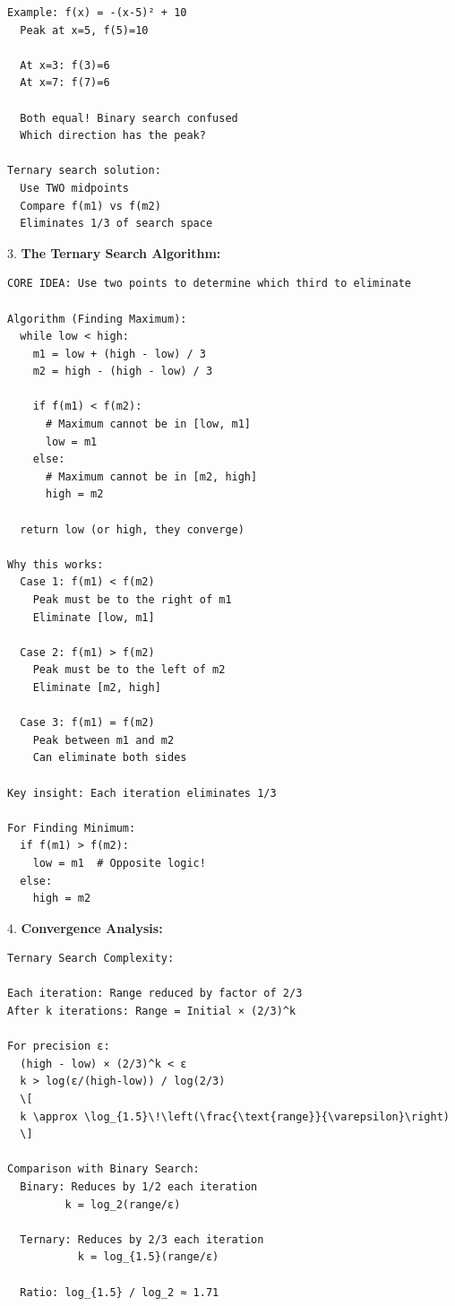 \documentclass[11pt,a4paper,oneside]{book}
\begin{document}
\begin{tcolorbox}[
    enhanced,breakable,
    colback=white,
    colframe=deepblue,
    boxrule=1.5pt,
    arc=3mm,
    title=\textbf{The Unimodal Property}
]
\begin{verbatim}
Example: f(x) = -(x-5)² + 10
  Peak at x=5, f(5)=10
  
  At x=3: f(3)=6
  At x=7: f(7)=6
  
  Both equal! Binary search confused
  Which direction has the peak?

Ternary search solution:
  Use TWO midpoints
  Compare f(m1) vs f(m2)
  Eliminates 1/3 of search space
\end{verbatim}

3. \textbf{The Ternary Search Algorithm:}
\begin{verbatim}
CORE IDEA: Use two points to determine which third to eliminate

Algorithm (Finding Maximum):
  while low < high:
    m1 = low + (high - low) / 3
    m2 = high - (high - low) / 3
    
    if f(m1) < f(m2):
      # Maximum cannot be in [low, m1]
      low = m1
    else:
      # Maximum cannot be in [m2, high]
      high = m2
  
  return low (or high, they converge)

Why this works:
  Case 1: f(m1) < f(m2)
    Peak must be to the right of m1
    Eliminate [low, m1]
  
  Case 2: f(m1) > f(m2)
    Peak must be to the left of m2
    Eliminate [m2, high]
  
  Case 3: f(m1) = f(m2)
    Peak between m1 and m2
    Can eliminate both sides

Key insight: Each iteration eliminates 1/3

For Finding Minimum:
  if f(m1) > f(m2):
    low = m1  # Opposite logic!
  else:
    high = m2
\end{verbatim}

4. \textbf{Convergence Analysis:}
\begin{verbatim}
Ternary Search Complexity:

Each iteration: Range reduced by factor of 2/3
After k iterations: Range = Initial × (2/3)^k

For precision ε:
  (high - low) × (2/3)^k < ε
  k > log(ε/(high-low)) / log(2/3)
  \[
  k \approx \log_{1.5}\!\left(\frac{\text{range}}{\varepsilon}\right)
  \]

Comparison with Binary Search:
  Binary: Reduces by 1/2 each iteration
         k = log_2(range/ε)
  
  Ternary: Reduces by 2/3 each iteration
           k = log_{1.5}(range/ε)
  
  Ratio: log_{1.5} / log_2 ≈ 1.71
  

\end{verbatim}
\end{tcolorbox}
\end{document}
